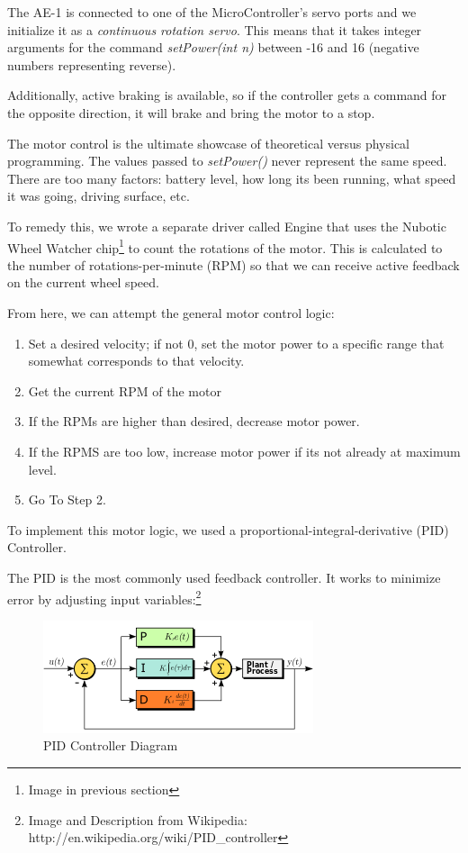 \documentclass[12pt]{article}
\begin{document}
The AE-1 is connected to one of the MicroController's servo ports and we initialize it as a \textit{continuous rotation servo}.  This means that it takes integer arguments for the command \textit{setPower(int n)} between -16 and 16 (negative numbers representing reverse).  

Additionally, active braking is available, so if the controller gets a command for the opposite direction, it will brake and bring the motor to a stop.

The motor control is the ultimate showcase of theoretical versus physical programming.  The values passed to \textit{setPower()} never represent the same speed.  There are too many factors: battery level, how long its been running, what speed it was going, driving surface, etc.

To remedy this, we wrote a separate driver called Engine that uses the Nubotic Wheel Watcher chip\footnote{Image in previous section} to count the rotations of the motor.  This is calculated to the number of rotations-per-minute (RPM) so that we can receive active feedback on the current wheel speed.

From here, we can attempt the general motor control logic:
\begin{enumerate}
\item Set a desired velocity; if not 0, set the motor power to a specific range that somewhat corresponds to that velocity.
\item Get the current RPM of the motor
\item If the RPMs are  higher than desired, decrease motor power.
\item If the RPMS are too low, increase motor power if its not already at maximum level.
\item Go To Step 2.
\end{enumerate}

To implement this motor logic, we used a proportional-integral-derivative (PID) Controller.

The PID is the most commonly used feedback controller.  It works to minimize error by adjusting input variables:\footnote{Image and Description from Wikipedia: http://en.wikipedia.org/wiki/PID\_controller}
\begin{figure}[h]
\centerline{\includegraphics{img/PID}}
\caption{PID Controller Diagram}
\end{figure}
\end{document}
